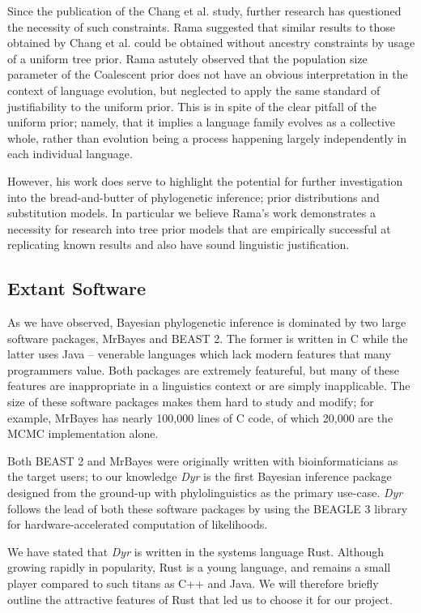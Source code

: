 \documentclass[10pt,journal,compsoc]{IEEEtran}
\begin{document}
Since the publication of the Chang et al. study, further research has questioned the necessity of such constraints. Rama suggested that similar results to those obtained by Chang et al. could be obtained without ancestry constraints by usage of a uniform tree prior.\cite{rama2018three} Rama astutely observed that the population size parameter of the Coalescent prior does not have an obvious interpretation in the context of language evolution, but neglected to apply the same standard of justifiability to the uniform prior. This is in spite of the clear pitfall of the uniform prior; namely, that it implies a language family evolves as a collective whole, rather than evolution being a process happening largely independently in each individual language.

However, his work does serve to highlight the potential for further investigation into the bread-and-butter of phylogenetic inference; prior distributions and substitution models. In particular we believe Rama's work demonstrates a necessity for research into tree prior models that are empirically successful at replicating known results and also have sound linguistic justification. 

\subsection{Extant Software}

As we have observed, Bayesian phylogenetic inference is dominated by two large software packages, MrBayes and BEAST 2. The former is written in C while the latter uses Java -- venerable languages which lack modern features that many programmers value. Both packages are extremely featureful, but many of these features are inappropriate in a linguistics context or are simply inapplicable. The size of these software packages makes them hard to study and modify; for example, MrBayes has nearly 100,000 lines of C code, of which 20,000 are the MCMC implementation alone.

Both BEAST 2 and MrBayes were originally written with bioinformaticians as the target users; to our knowledge \textit{Dyr} is the first Bayesian inference package designed from the ground-up with phylolinguistics as the primary use-case. \textit{Dyr} follows the lead of both these software packages by using the BEAGLE 3 library for hardware-accelerated computation of likelihoods\cite{ayres2019beagle}.

We have stated that \textit{Dyr} is written in the systems language Rust. Although growing rapidly in popularity, Rust is a young language, and remains a small player compared to such titans as C++ and Java. We will therefore briefly outline the attractive features of Rust that led us to choose it for our project.
\end{document}
